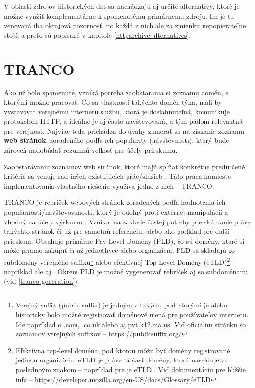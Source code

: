 V oblasti zdrojov historických dát sa nachádzajú aj určité alternatívy, ktoré je možné využiť komplementárne k spomenutému primárnemu zdroju.
Im je tu venovaná iba okrajová pozornosť, no každá z nich ale za zmienku nepopierateľne stojí, a preto sú popísané v kapitole \ref{httparchive-alternatives}.


\section{TRANCO}
\label{tranco}

Ako už bolo spomenuté, vzniká potreba zaobstarania si zoznamu domén, s ktorými možno pracovať. Čo sa vlastností takýchto domén týka,
mali by vystavovať verejnému internetu službu, ktorá je dosiahnuteľná, komunikuje protokolom HTTP, a ideálne je aj často navštevovaná,
a tým pádom relevantná pre verejnosť. Najviac teda prichádza do úvahy zamerať sa na získanie zoznamu \textbf{web stránok}, zoradeného podľa
ich popularity (návštevnosti), ktorý bude zároveň nadobúdať rozumnú veľkosť pre účely prieskumu. 

Zaobstarávaniu zoznamov web stránok, ktoré majú spĺňať konkrétne predurčené kritéria sa venuje rad iných existujúcich prác/služieb 
\cite{tranco}\cite{hacker-target-website-lists-overview}. Táto práca namiesto implementovania vlastného riešenia využíva jedno z nich -- TRANCO.

TRANCO je rebríček webových stránok zoradených podľa hodnotenia ich populárnosti/navštevovanosti, ktorý je odolný proti externej manipulácií a vhodný na účely výskumu \cite{tranco-homepage}. 
Vznikol na základe častej potreby pre skúmanie práve takýchto stránok či už pre samotnú referenciu, alebo ako podklad pre ďalší prieskum.
Obsahuje primárne Pay-Level Domény (PLD), čo sú domény, ktoré si môže priamo zakúpiť či už jednotlivec alebo organizácia. PLD sa skladajú zo subdomény verejného 
suffixu\footnote{Verejný suffix (public suffix) je jedným z takých, pod ktorými je alebo historicky bolo možné registrovať doménové mená pre používateľov internetu. Ide napríklad o .com, .co.uk 
alebo aj pvt.k12.ma.us. Viď oficiálnu stránku so zoznamov verejných suffixov -- \href{https://publicsuffix.org/}{https://publicsuffix.org/}} 
alebo efektívnej Top-Level Domény (eTLD)\footnote{Efektívna top-level doména, pod ktorou môžu byť domény registrované jedinou organizáciu. eTLD je práve tá časť domény, ktorá naselduje za poslednoým 
znakom  -- napríklad pre  je eTLD . Viď dokumentáciu pre bližšie info -- \href{https://developer.mozilla.org/en-US/docs/Glossary/eTLD}
{https://developer.mozilla.org/en-US/docs/Glossary/eTLD}} -- napríklad  ale aj  \cite{tranco}. Okrem PLD je možné vygenerovať rebríček aj so subdoménami (viď 
\ref{tranco-generation}).

